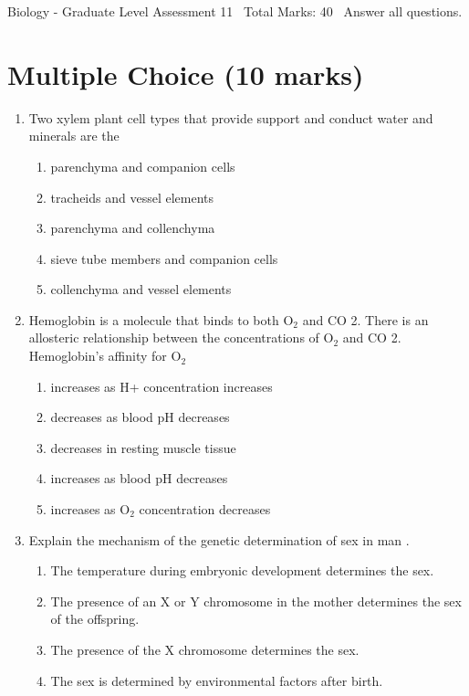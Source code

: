 \documentclass[12pt]{article}
\begin{document}
\begin{center}
Biology - Graduate Level Assessment 11 \
Total Marks: 40 \
Answer all questions.
\end{center}

\section*{Multiple Choice (10 marks)}
\begin{enumerate}[label=\arabic*.]
\item Two xylem plant cell types that provide support and conduct water and minerals are the
\begin{enumerate}[label=(\alph*)]
    \item parenchyma and companion cells
    \item tracheids and vessel elements
    \item parenchyma and collenchyma
    \item sieve tube members and companion cells
    \item collenchyma and vessel elements
\end{enumerate}
\item Hemoglobin is a molecule that binds to both O$_{2}$ and CO 2. There is an allosteric relationship between the concentrations of O$_{2}$ and CO 2. Hemoglobin's affinity for O$_{2}$
\begin{enumerate}[label=(\alph*)]
    \item increases as H+ concentration increases
    \item decreases as blood pH decreases
    \item decreases in resting muscle tissue
    \item increases as blood pH decreases
    \item increases as O$_{2}$ concentration decreases
\end{enumerate}
\item Explain the mechanism of the genetic determination of sex in man .
\begin{enumerate}[label=(\alph*)]
    \item The temperature during embryonic development determines the sex.
    \item The presence of an X or Y chromosome in the mother determines the sex of the offspring.
    \item The presence of the X chromosome determines the sex.
    \item The sex is determined by environmental factors after birth.

\end{enumerate}
\end{enumerate}
\end{document}

